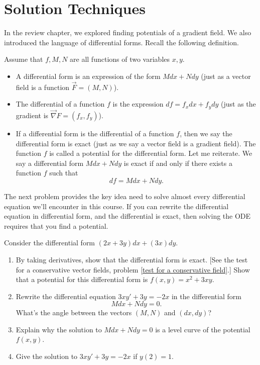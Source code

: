 \section{Solution Techniques}
In the review chapter, we explored finding potentials of a gradient field.  We also introduced the language of differential forms.  Recall the following definition. 
\begin{definition}
Assume that $f,M,N$ are all functions of two variables $x,y$.
\begin{itemize}
\item A differential form is an expression of the form $Mdx+Ndy$ (just as a vector field is a function  $\vec F=(M,N)$).
\item The differential of a function {$f$} is the expression {$df = f_xdx+f_ydy$} (just as the gradient is $\vec \nabla F = (f_x,f_y)$).
\item {}%
If a differential form is the differential of a function {$f$}, then we say the differential form is exact (just as we say a vector field is a gradient field). The function {$f$} is called a potential for the differential form. Let me reiterate.  We say a differential form $Mdx+Ndy$ is exact if and only if there exists a function $f$ such that $$df=Mdx+Ndy.$$
\end{itemize} 
\end{definition}


The next problem provides the key idea need to solve almost every differential equation we'll encounter in this course. If you can rewrite the differential equation in differential form, and the differential is exact, then solving the ODE requires that you find a potential.
\begin{problem} 
Consider the differential form $(2x+3y)dx+(3x)dy$. 
\begin{enumerate}
 \item By taking derivatives, show that the differential form is exact. [See the test for a conservative vector fields, problem \ref{test for a conservative field}.] Show that a potential for this differential form is $f(x,y) = x^2+3xy$.  
 \item Rewrite the differential equation $3xy'+3y=-2x$ in the differential form 
$$Mdx+Ndy=0.$$ 
  What's the angle between the vectors $(M,N)$ and $(dx,dy)$?
 \item Explain why the solution to $Mdx+Ndy=0$ is a level curve of the potential $f(x,y)$.
 \item Give the solution to $3xy'+3y=-2x$ if $y(2)=1$. 
\end{enumerate}
\end{problem}

